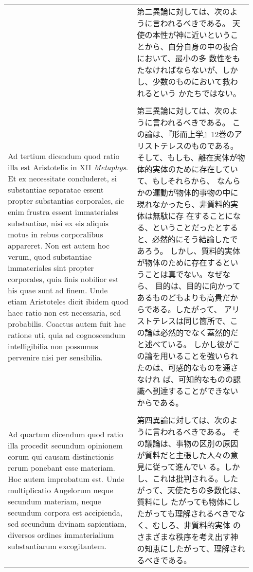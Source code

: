 \documentclass[10pt]{jsarticle} %
\begin{document}
\begin{longtable}{p{21em}p{21em}}
&

第二異論に対しては、次のように言われるべきである。
天使の本性が神に近いということから、自分自身の中の複合において、最小の多
 数性をもたなければならないが、しかし、少数のものにおいて救われるという
 かたちではない。

\\\\


Ad tertium dicendum quod ratio illa est
Aristotelis in XII {\itshape Metaphys}. Et ex necessitate concluderet, si
substantiae separatae essent propter substantias corporales, sic enim
frustra essent immateriales substantiae, nisi ex eis aliquis motus in
rebus corporalibus appareret. Non est autem hoc verum, quod substantiae
immateriales sint propter corporales, quia finis nobilior est his quae
sunt ad finem. Unde etiam Aristoteles dicit ibidem quod haec ratio non
est necessaria, sed probabilis. Coactus autem fuit hac ratione uti, quia
ad cognoscendum intelligibilia non possumus pervenire nisi per
sensibilia.


&

第三異論に対しては、次のように言われるべきである。
この論は、『形而上学』12巻のアリストテレスのものである。
そして、もしも、離在実体が物体的実体のために存在していて、もしそれらから、
 なんらかの運動が物体的事物の中に現れなかったら、非質料的実体は無駄に存
 在することになる、ということだったとすると、必然的にそう結論したであろう。
しかし、質料的実体が物体のために存在するということは真でない。なぜなら、
 目的は、目的に向かってあるものどもよりも高貴だからである。したがって、
 アリストテレスは同じ箇所で、この論は必然的でなく蓋然的だと述べている。
 しかし彼がこの論を用いることを強いられたのは、可感的なものを通さなけれ
 ば、可知的なものの認識へ到達することができないからである。


\\\\


Ad quartum dicendum quod ratio illa procedit
secundum opinionem eorum qui causam distinctionis rerum ponebant esse
materiam. Hoc autem improbatum est. Unde multiplicatio Angelorum neque
secundum materiam, neque secundum corpora est accipienda, sed secundum
divinam sapientiam, diversos ordines immaterialium substantiarum
excogitantem.


&

第四異論に対しては、次のように言われるべきである。
その議論は、事物の区別の原因が質料だと主張した人々の意見に従って進んでい
 る。しかし、これは批判される。したがって、天使たちの多数化は、質料にし
 たがっても物体にしたがっても理解されるべきでなく、むしろ、非質料的実体
 のさまざまな秩序を考え出す神の知恵にしたがって、理解されるべきである。


\end{longtable}
\end{document}
